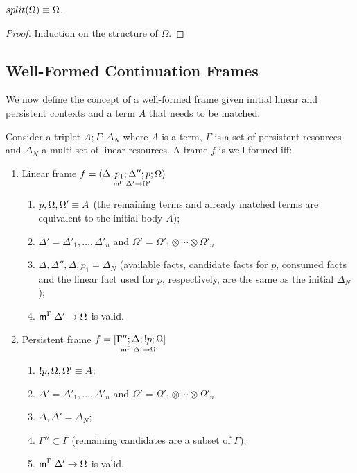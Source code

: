 \begin{theorem}
$\feq{split(\Omega)}{\Omega}$.
\end{theorem}
\begin{proof}
Induction on the structure of $\Omega$.
\end{proof}

\subsection{Well-Formed Continuation Frames}

We now define the concept of a well-formed frame given initial linear and
persistent contexts and a term $A$ that needs to be matched.

\begin{definition}

Consider a triplet $A; \Gamma; \Delta_{N}$ where $A$ is a term, $\Gamma$ is a
set of persistent resources and $\Delta_{N}$ a multi-set of linear
resources. A frame $f$ is well-formed iff:

\begin{enumerate}[leftmargin=*]
   \item Linear frame $f = \lframe{\Delta,
      p_1}{\Delta''}{p}{\Omega}{\Delta'}{\Omega'}$

   \begin{enumerate}
      \item $\feq{p, \Omega, \Omega'}{A}$ (the remaining terms and already
               matched terms are equivalent to the initial body $A$);
      \item $\Delta' = \Delta'_1, \dotsc, \Delta'_n$ and $\Omega' =
      \Omega'_1 \otimes \dotsb \otimes \Omega'_n$
      \item $\Delta, \Delta'', \Delta, p_1 = \Delta_{N}$ (available facts, candidate
            facts for $p$, consumed facts and the linear fact used for $p$,
            respectively, are the same as the initial $\Delta_{N}$);
      \item $\mz{\Gamma}{\Delta'}{\Omega}$ is valid.

   \end{enumerate}
   \item Persistent frame $f = \pframe{\Gamma''}{\Delta}{\bang
   p}{\Omega}{\Delta'}{\Omega'}$
      \begin{enumerate}
         \item $\feq{\bang p, \Omega, \Omega'}{A}$;
         \item $\Delta' = \Delta'_1, \dotsc, \Delta'_n$ and $\Omega' =
         \Omega'_1 \otimes \dotsb \otimes \Omega'_n$
         \item $\Delta, \Delta' = \Delta_{N}$;
         \item $\Gamma'' \subset \Gamma$ (remaining candidates are a subset of
                     $\Gamma$);
         \item $\mz{\Gamma}{\Delta'}{\Omega}$ is valid.
      \end{enumerate}
\end{enumerate}
\end{definition}


